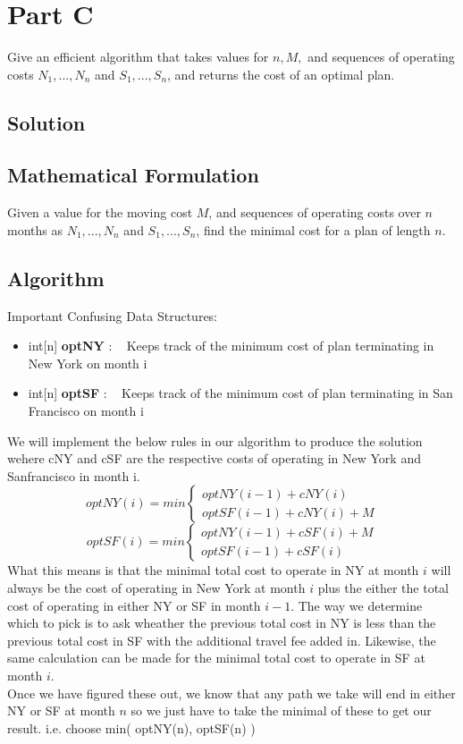 \documentclass[12pt]{article}
\begin{document}
\newpage
\section{Part C}
Give an efficient algorithm that takes values for $n,M,$ and sequences of operating costs $N_1,...,N_n$
and $S_1,...,S_n$, and returns the cost of an optimal plan.

\subsection*{Solution}
\subsection{Mathematical Formulation}
Given a value for the moving cost $M$, and sequences of operating costs over $n$ months as $N_1,...,N_n$
and $S_1,...,S_n$, find the minimal cost for a plan of length $n$.


\subsection{Algorithm}
Important Confusing Data Structures:
\begin{itemize}
    \item int[n] \textbf{optNY} : ~ Keeps track of the minimum cost of plan terminating in New York on month i
    \item int[n] \textbf{optSF} : ~ Keeps track of the minimum cost of plan terminating in San Francisco on month i
\end{itemize}
We will implement the below rules in our algorithm to produce the solution wehere cNY and cSF are the
respective costs of operating in New York and Sanfrancisco in month i.
\[ optNY(i) = min
    \begin{cases}
        optNY(i-1) + cNY(i)     \\
        optSF(i-1) + cNY(i) + M
    \end{cases}
\]
\[ optSF(i) = min
    \begin{cases}
        optNY(i-1) + cSF(i) + M  \\
        optSF(i-1) + cSF(i)
    \end{cases}
\]
\indent What this means is that the minimal total cost to operate in NY at month $i$ will always be the cost
of operating in New York at month $i$ plus the either the total cost of operating in either NY or SF in
month $i-1$. The way we determine which to pick is to ask wheather the previous total cost in NY is less
than the previous total cost in SF with the additional travel fee added in. Likewise, the same calculation
can be made for the minimal total cost to operate in SF at month $i$. \\
\indent Once we have figured these out, we know that any path we take will end in either NY or SF at month
$n$ so we just have to take the minimal of these to get our result. i.e. choose min( optNY(n), optSF(n) )
\end{document}
